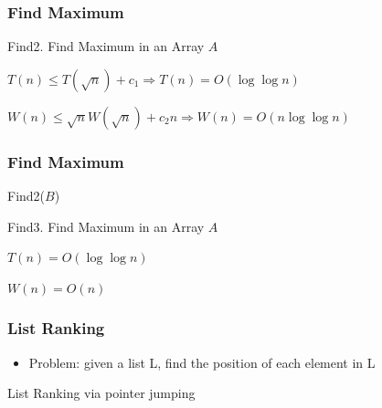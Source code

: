 \documentclass[12pt,aspectratio=169]{beamer}
\begin{document}
\begin{frame}\frametitle{Find Maximum}
\begin{algorithm}[H]
\caption{Find2.    
Find Maximum in an Array $A$}
\end{algorithm}
$T(n)\le T(\sqrt{n}) + c_{1} \Rightarrow T(n) = O(\log \log n)$

$W(n)\le \sqrt{n} W(\sqrt{n}) + c_{2}n \Rightarrow W(n) = O(n \log \log n)$
\end{frame}


\begin{frame}\frametitle{Find Maximum}
\begin{algorithm}[H]
Find2($B$)\;
\caption{Find3.    
Find Maximum in an Array $A$}
\end{algorithm}
$T(n) = O(\log \log n)$

$W(n) = O(n)$
\end{frame}

\begin{frame}\frametitle{List Ranking}
  \begin{itemize}[<.->]
  \item
    Problem: given a list L, find the position of each element in L
  \end{itemize}
\begin{algorithm}[H]
\caption{List Ranking via pointer jumping}
\end{algorithm}
\end{frame}
\end{document}
